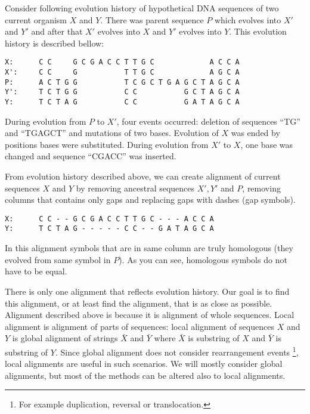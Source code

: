 \begin{example} 
Consider following evolution history of hypothetical DNA sequences of two
current organism $X$ and $Y$. There was parent sequence $P$ which evolves into
$X'$ and $Y'$ and after that $X'$ evolves into $X$ and $Y'$ evolves into $Y$.
This evolution history is described bellow: 
\begin{verbatim}
X:      C C     G C G A C C T T G C             A C C A
X':     C C     G           T T G C             A G C A
P:      A C T G G           T C G C T G A G C T A G C A
Y':     T C T G G           C C           G C T A G C A
Y:      T C T A G           C C           G A T A G C A
\end{verbatim}
During evolution from $P$ to $X'$, four events occurred: deletion of 
sequences ``TG''  and ``TGAGCT'' and mutations of two bases. Evolution of $X$
was ended by  
positions bases were substituted. During evolution from $X'$ to $X$, one base was
changed and sequence ``CGACC'' was inserted.  

From evolution history described above, we can create alignment of current
sequences $X$ and $Y$ by removing ancestral sequences $X',Y'$ and $P$, 
removing columns that contains only gaps and
replacing gaps with dashes (gap symbols). 
\begin{verbatim}
X:      C C - - G C G A C C T T G C - - - A C C A
Y:      T C T A G - - - - - C C - - G A T A G C A
\end{verbatim}
In this alignment symbols that are in same column are truly homologous (they
evolved from same symbol in $P$).
As you can see, homologous symbols do not have to be equal.
\end{example}

There is only one alignment that reflects evolution history. Our goal is to find
this alignment, or at least find the alignment, that is as close as possible.
Alignment described above is  because it is
alignment of whole sequences. Local alignment is alignment of parts of
sequences: local alignment of sequences $X$ and $Y$ is global alignment of
strings $\bar{X}$ and $\bar{Y}$ where $\bar{X}$ is substring of $X$ and $\bar{Y}$ is substring of
$Y$.  Since global alignment does not consider rearrangement events
\footnote{For example duplication, reversal or translocation.}, local alignments
are useful in such scenarios.  We will mostly consider global alignments, but
most of the methods can be altered also to local alignments.

